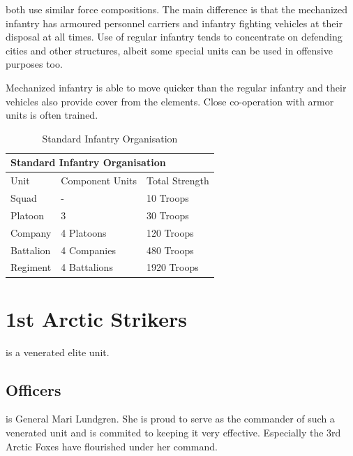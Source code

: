 \documentclass{tufte-book}
\begin{document}
 both use similar force
compositions. The main difference is that the mechanized infantry has
armoured personnel carriers and infantry fighting vehicles at their
disposal at all times. Use of regular infantry tends to concentrate on
defending cities and other structures, albeit some special units can be
used in offensive purposes too.

Mechanized infantry is able to move quicker than the regular infantry
and their vehicles also provide cover from the elements. Close
co-operation with armor units is often trained.

\bigskip
\begin{table}
\begin{minipage}{\textwidth}
\begin{center}
\begin{tabular}{lll}
\toprule
\multicolumn{3}{l}{Standard Infantry Organisation} \\
\midrule
Unit & Component Units & Total Strength \\
\midrule
Squad     & -            & 10 Troops \\
Platoon   & 3            & 30 Troops \\
Company   & 4 Platoons   & 120 Troops \\
Battalion & 4 Companies  & 480 Troops \\
Regiment  & 4 Battalions & 1920 Troops \\
\bottomrule
\end{tabular}
\end{center}
\end{minipage}
\caption{Standard Infantry Organisation}
\end{table}

\section{1st Arctic Strikers}

 is a venerated elite unit. 

\subsection{Officers}

 is General Mari Lundgren.
She is proud to serve as the commander of such a venerated unit and is
commited to keeping it very effective. Especially the 3rd Arctic
Foxes have flourished under her command.
\end{document}
